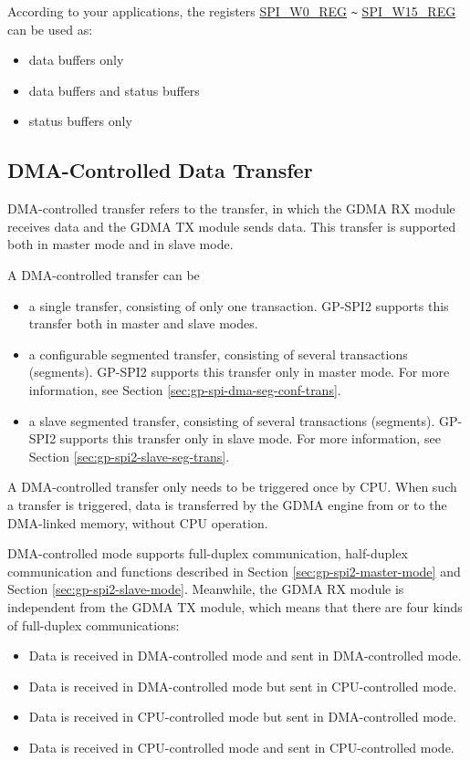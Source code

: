 \documentclass[main\_\_EN.tex]{subfiles}
\begin{document}
According to your applications, the registers \hyperref[regdesc:SPIW0REG]{SPI\_W0\_REG} \verb+~+ \hyperref[regdesc:SPIW15REG]{SPI\_W15\_REG} can be used as:
\begin{itemize}
    \item data buffers only
    \item data buffers and status buffers
    \item status buffers only
\end{itemize}

\subsection{DMA-Controlled Data Transfer}\label{sec:usage-of-gp-spi2-dma-controlled-mode}

DMA-controlled transfer refers to the transfer, in which the GDMA RX module receives data and the GDMA TX module sends data. This transfer is supported both in master mode and in slave mode.

A DMA-controlled transfer can be

\begin{itemize}
    \item a single transfer, consisting of only one transaction. GP-SPI2 supports this transfer both in master and slave modes.
    \item a configurable segmented transfer, consisting of several transactions (segments). GP-SPI2 supports this transfer only in master mode. For more information, see Section \ref{sec:gp-spi-dma-seg-conf-trans}.
    \item a slave segmented transfer, consisting of several transactions (segments). GP-SPI2 supports this transfer only in slave mode. For more information, see Section \ref{sec:gp-spi2-slave-seg-trans}.
\end{itemize}

A DMA-controlled transfer only needs to be triggered once by CPU. When such a transfer is triggered, data is transferred by the GDMA engine from or to the DMA-linked memory, without CPU operation.

DMA-controlled mode supports full-duplex communication, half-duplex communication and functions described in Section \ref{sec:gp-spi2-master-mode} and Section \ref{sec:gp-spi2-slave-mode}. Meanwhile, the GDMA RX module is independent from the GDMA TX module, which means that there are four kinds of full-duplex communications:

\begin{itemize}
    \item Data is received in DMA-controlled mode and sent in DMA-controlled mode.

    \item Data is received in DMA-controlled mode but sent in CPU-controlled mode.

    \item Data is received in CPU-controlled mode but sent in DMA-controlled mode.

    \item Data is received in CPU-controlled mode and sent in CPU-controlled mode.

\end{itemize}
\end{document}
